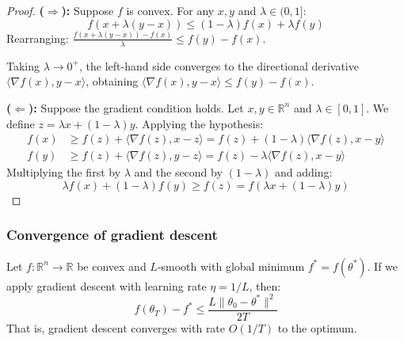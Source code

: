 \begin{proof}
	\textbf{(\(\Rightarrow\)):} Suppose \(f\) is convex. For any \(x, y\) and \(\lambda \in (0,1]\):
	\[
		f(x + \lambda(y-x)) \leq (1-\lambda)f(x) + \lambda f(y)
	\]
	Rearranging: \(\frac{f(x + \lambda(y-x)) - f(x)}{\lambda} \leq f(y) - f(x)\).

	Taking \(\lambda \to 0^+\), the left-hand side converges to the directional derivative \(\langle \nabla f(x), y-x \rangle\), obtaining \(\langle \nabla f(x), y-x \rangle \leq f(y) - f(x)\).

	\textbf{(\(\Leftarrow\)):} Suppose the gradient condition holds. Let \(x, y \in \mathbb{R}^n\) and \(\lambda \in [0,1]\). We define \(z = \lambda x + (1-\lambda)y\). Applying the hypothesis:
	\begin{align*}
		f(x) &\geq f(z) + \langle \nabla f(z), x - z \rangle = f(z) + (1-\lambda)\langle \nabla f(z), x - y \rangle \\
		f(y) &\geq f(z) + \langle \nabla f(z), y - z \rangle = f(z) - \lambda\langle \nabla f(z), x - y \rangle
	\end{align*}
	Multiplying the first by \(\lambda\) and the second by \((1-\lambda)\) and adding:
	\[
		\lambda f(x) + (1-\lambda)f(y) \geq f(z) = f(\lambda x + (1-\lambda)y)
	\]
\end{proof}

\subsubsection{Convergence of gradient descent}

\begin{theorem}\label{thm:gd_convergence_convex}
	Let \(f: \mathbb{R}^n \to \mathbb{R}\) be convex and \(L\)-smooth with global minimum \(f^* = f(\theta^*)\). If we apply gradient descent with learning rate \(\eta = 1/L\), then:
	\[
		f(\theta_T) - f^* \leq \frac{L\|\theta_0 - \theta^*\|^2}{2T}
	\]
	That is, gradient descent converges with rate \(O(1/T)\) to the optimum.
\end{theorem}

